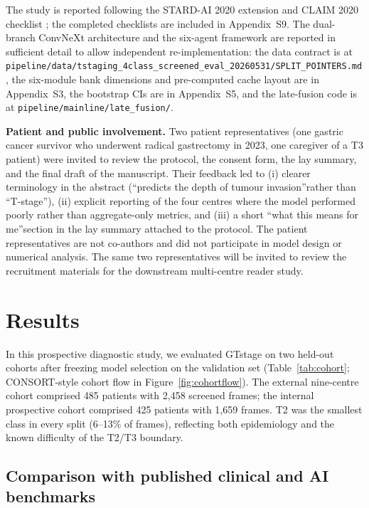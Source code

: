 \documentclass[11pt,a4paper]{article}
\begin{document}
The study is reported following the STARD-AI 2020 extension \cite{sounderajah2025stard} and CLAIM 2020 checklist \cite{liu2020claim}; the completed checklists are included in Appendix~S9. The dual-branch ConvNeXt architecture and the six-agent framework are reported in sufficient detail to allow independent re-implementation: the data contract is at \texttt{pipeline/data/tstaging\_4class\_screened\_eval\_20260531/SPLIT\_POINTERS.md}, the six-module bank dimensions and pre-computed cache layout are in Appendix~S3, the bootstrap CIs are in Appendix~S5, and the late-fusion code is at \texttt{pipeline/mainline/late\_fusion/}.

\textbf{Patient and public involvement.} Two patient representatives (one gastric cancer survivor who underwent radical gastrectomy in 2023, one caregiver of a T3 patient) were invited to review the protocol, the consent form, the lay summary, and the final draft of the manuscript. Their feedback led to (i) clearer terminology in the abstract (\textquotedblleft predicts the depth of tumour invasion\textquotedblright rather than \textquotedblleft T-stage\textquotedblright), (ii) explicit reporting of the four centres where the model performed poorly rather than aggregate-only metrics, and (iii) a short \textquotedblleft what this means for me\textquotedblright section in the lay summary attached to the protocol. The patient representatives are not co-authors and did not participate in model design or numerical analysis. The same two representatives will be invited to review the recruitment materials for the downstream multi-centre reader study.

\section{Results}
\label{sec:results}

In this prospective diagnostic study, we evaluated GTstage on two held-out cohorts after freezing model selection on the validation set (Table~\ref{tab:cohort}; CONSORT-style cohort flow in Figure~\ref{fig:cohortflow}). The external nine-centre cohort comprised 485 patients with 2{,}458 screened frames; the internal prospective cohort comprised 425 patients with 1{,}659 frames. T2 was the smallest class in every split (6--13\% of frames), reflecting both epidemiology and the known difficulty of the T2/T3 boundary.

\subsection{Comparison with published clinical and AI benchmarks}
\end{document}
